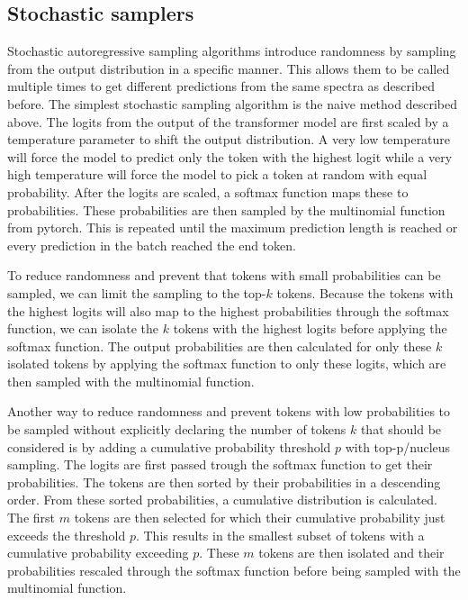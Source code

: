 \subsection{Stochastic samplers}

Stochastic autoregressive sampling algorithms introduce randomness by sampling from the output distribution in a specific manner.
This allows them to be called multiple times to get different predictions from the same spectra as described before.
The simplest stochastic sampling algorithm is the naive method described above.
The logits from the output of the transformer model are first scaled by a temperature parameter to shift the output distribution.
A very low temperature will force the model to predict only the token with the highest logit while a very high temperature will force the model to pick a token at random with equal probability.
After the logits are scaled, a softmax function maps these to probabilities. These probabilities are then sampled by the multinomial function from pytorch.
This is repeated until the maximum prediction length is reached or every prediction in the batch reached the end token.

To reduce randomness and prevent that tokens with small probabilities can be sampled, we can limit the sampling to the top-$k$ tokens.
Because the tokens with the highest logits will also map to the highest probabilities through the softmax function,
we can isolate the $k$ tokens with the highest logits before applying the softmax function.
The output probabilities are then calculated for only these $k$ isolated tokens by applying the softmax function to only these logits, which are then sampled with the multinomial function.

Another way to reduce randomness and prevent tokens with low probabilities to be sampled without explicitly declaring the number of tokens $k$ that should be considered is by adding a cumulative probability threshold $p$ with top-p/nucleus sampling.
The logits are first passed trough the softmax function to get their probabilities.
The tokens are then sorted by their probabilities in a descending order.
From these sorted probabilities, a cumulative distribution is calculated.
The first $m$ tokens are then selected for which their cumulative probability just exceeds the threshold $p$.
This results in the smallest subset of tokens with a cumulative probability exceeding $p$.
These $m$ tokens are then isolated and their probabilities rescaled through the softmax function before being sampled with the multinomial function.

